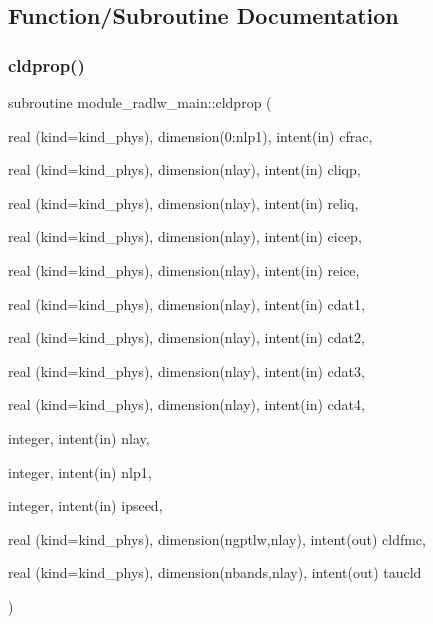 \subsection{Function/\+Subroutine Documentation}
\mbox{\label{group__module__radlw__main_ga6bfdea656cc7e1f773ffcc797e072e91}} 
\subsubsection{\texorpdfstring{cldprop()}{cldprop()}}
{\footnotesize\ttfamily subroutine module\+\_\+radlw\+\_\+main\+::cldprop (\begin{DoxyParamCaption}\item[{real (kind=kind\+\_\+phys), dimension(0\+:nlp1), intent(in)}]{cfrac,  }\item[{real (kind=kind\+\_\+phys), dimension(nlay), intent(in)}]{cliqp,  }\item[{real (kind=kind\+\_\+phys), dimension(nlay), intent(in)}]{reliq,  }\item[{real (kind=kind\+\_\+phys), dimension(nlay), intent(in)}]{cicep,  }\item[{real (kind=kind\+\_\+phys), dimension(nlay), intent(in)}]{reice,  }\item[{real (kind=kind\+\_\+phys), dimension(nlay), intent(in)}]{cdat1,  }\item[{real (kind=kind\+\_\+phys), dimension(nlay), intent(in)}]{cdat2,  }\item[{real (kind=kind\+\_\+phys), dimension(nlay), intent(in)}]{cdat3,  }\item[{real (kind=kind\+\_\+phys), dimension(nlay), intent(in)}]{cdat4,  }\item[{integer, intent(in)}]{nlay,  }\item[{integer, intent(in)}]{nlp1,  }\item[{integer, intent(in)}]{ipseed,  }\item[{real (kind=kind\+\_\+phys), dimension(ngptlw,nlay), intent(out)}]{cldfmc,  }\item[{real (kind=kind\+\_\+phys), dimension(nbands,nlay), intent(out)}]{taucld }\end{DoxyParamCaption})\hspace{0.3cm}{\ttfamily [private]}}


